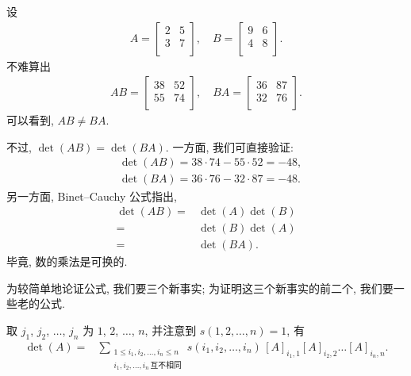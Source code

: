 \begin{example}
    设
    \begin{align*}
        A = \begin{bmatrix}
                2 & 5 \\
                3 & 7 \\
            \end{bmatrix},
        \quad
        B = \begin{bmatrix}
                9 & 6 \\
                4 & 8 \\
            \end{bmatrix}.
    \end{align*}
    不难算出
    \begin{align*}
        AB
        = \begin{bmatrix}
              38 & 52 \\
              55 & 74 \\
          \end{bmatrix},
        \quad
        BA
        = \begin{bmatrix}
              36 & 87 \\
              32 & 76 \\
          \end{bmatrix}.
    \end{align*}
    可以看到, \(AB \neq BA\).

    不过, \(\det {(AB)} = \det {(BA)}\).
    一方面, 我们可直接验证:
    \begin{align*}
         & \det {(AB)} = 38 \cdot 74 - 55 \cdot 52 = -48, \\
         & \det {(BA)} = 36 \cdot 76 - 32 \cdot 87 = -48.
    \end{align*}
    另一方面, Binet--Cauchy 公式指出,
    \begin{align*}
        \det {(AB)}
        = {} & \det {(A)} \det {(B)} \\
        = {} & \det {(B)} \det {(A)} \\
        = {} & \det {(BA)}.
    \end{align*}
    毕竟, 数的乘法是可换的.
\end{example}

为较简单地论证公式,
我们要三个新事实;
为证明这三个新事实的前二个,
我们要一些老的公式.

\TheoremFullExpansion*

取 \(j_1\), \(j_2\), \(\dots\), \(j_n\)
为 \(1\), \(2\), \(\dots\), \(n\),
并注意到 \(s(1, 2, \dots, n) = 1\),
有
\begin{align*}
    \det {(A)}
    = {} &
    \sum_{\substack{
    1 \leq i_1, i_2, \dots, i_n \leq n \\
            i_1, i_2, \dots, i_n\,\text{互不相同}
        }}
    {s(i_1, i_2, \dots, i_n)\,
        [A]_{i_1,1} [A]_{i_2,2} \dots [A]_{i_n,n}}.
\end{align*}


